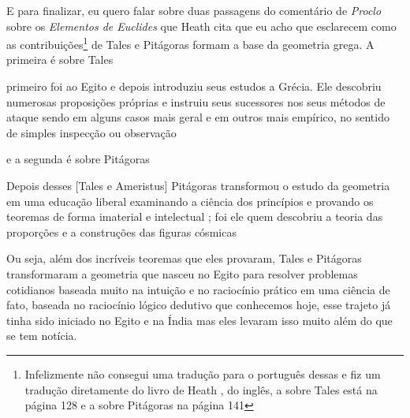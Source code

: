 \documentclass{article}
\begin{document}
E para finalizar, eu quero falar sobre duas passagens do comentário de \emph{Proclo}
sobre os \emph{Elementos de Euclides} que
Heath cita \cite{Heath} que eu acho que esclarecem como as contribuições\footnote{
Infelizmente não consegui uma tradução para o português dessas e
fiz um tradução diretamente do livro de Heath \cite{Heath}, do inglês, a
sobre Tales está na página 128 e a sobre Pitágoras na página 141}
de Tales e Pitágoras formam a base da geometria grega. A primeira é sobre
Tales

\begin{framed}
	[...] primeiro foi ao Egito e depois introduziu seus estudos 
	a Grécia. Ele descobriu numerosas proposições próprias e 
	instruiu seus sucessores nos seus métodos de ataque sendo em
	alguns casos mais geral e em outros mais empírico, no sentido
	de simples inspecção ou observação
\end{framed}

e a segunda é sobre Pitágoras

\begin{framed}
	Depois desses [Tales e Ameristus] Pitágoras transformou o estudo
	da geometria em uma educação liberal examinando a ciência dos 
	princípios e provando os teoremas de forma imaterial e intelectual ;
	foi ele quem descobriu a teoria das proporções e a construções das 
	figuras cósmicas 
\end{framed}

Ou seja, além dos incríveis teoremas que eles provaram, Tales e Pitágoras
transformaram a geometria que nasceu no Egito para resolver problemas cotidianos
baseada muito na intuição e no raciocínio prático em uma ciência de fato,
baseada no raciocínio lógico dedutivo que conhecemos hoje,
esse trajeto já tinha sido iniciado no Egito e na Índia mas eles levaram isso 
muito além do que se tem notícia.



\end{document}
